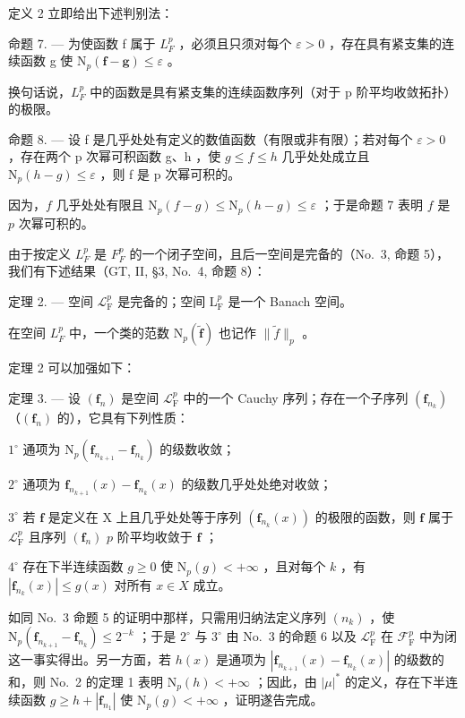 定义 2 立即给出下述判别法：

命题 7. --- 为使函数 f 属于 \(L_{F}^{p}\) ，必须且只须对每个 \(\varepsilon > 0\) ，存在具有紧支集的连续函数 g 使 \(\mathrm{N}_{p}(\mathbf{f} - \mathbf{g}) \leqslant \varepsilon\) 。

换句话说，\(L_{F}^{p}\) 中的函数是具有紧支集的连续函数序列（对于 p 阶平均收敛拓扑）的极限。

命题 8. --- 设 f 是几乎处处有定义的数值函数（有限或非有限）；若对每个 \(\varepsilon > 0\) ，存在两个 p 次幂可积函数 g、h ，使 \(g \leqslant f \leqslant h\) 几乎处处成立且 \(\mathrm{N}_{p}(h - g) \leqslant \varepsilon\) ，则 f 是 p 次幂可积的。

因为，\(f\) 几乎处处有限且 \(\mathrm{N}_p(f - g) \leqslant \mathrm{N}_p(h - g) \leqslant \varepsilon\) ；于是命题 7 表明 \(f\) 是 \(p\) 次幂可积的。

由于按定义 \(L_{F}^{p}\) 是 \(F_{F}^{p}\) 的一个闭子空间，且后一空间是完备的（No.~3, 命题 5），我们有下述结果（GT, II, §3, No.~4, 命题 8）：

定理 2. --- 空间 \(\mathcal{L}_{\mathrm{F}}^{p}\) 是完备的；空间 \(\mathrm{L}_{\mathrm{F}}^{p}\) 是一个 Banach 空间。

在空间 \(L_{F}^{p}\) 中，一个类的范数 \(\mathrm{N}_{p}(\widetilde{\mathbf{f}})\) 也记作 \(\| \widetilde{f} \|_{p}\) 。

定理 2 可以加强如下：

定理 3. --- 设 \((\mathbf{f}_n)\) 是空间 \(\mathcal{L}_{\mathrm{F}}^p\) 中的一个 Cauchy 序列；存在一个子序列 \((\mathbf{f}_{n_k})\) （\((\mathbf{f}_n)\) 的），它具有下列性质：

\(1^{\circ}\) 通项为 \(\mathrm{N}_p(\mathbf{f}_{n_{k + 1}} - \mathbf{f}_{n_k})\) 的级数收敛；

\(2^{\circ}\) 通项为 \(\mathbf{f}_{n_{k+1}}(x) - \mathbf{f}_{n_k}(x)\) 的级数几乎处处绝对收敛；

\(3^{\circ}\) 若 \(\mathbf{f}\) 是定义在 X 上且几乎处处等于序列 \((\mathbf{f}_{n_k}(x))\) 的极限的函数，则 \(\mathbf{f}\) 属于 \(\mathcal{L}_{\mathrm{F}}^p\) 且序列 \((\mathbf{f}_n)\) \(p\) 阶平均收敛于 \(\mathbf{f}\) ；

\(4^{\circ}\) 存在下半连续函数 \(g \geqslant 0\) 使 \(\mathrm{N}_p(g) < +\infty\) ，且对每个 \(k\) ，有 \(|\mathbf{f}_{n_k}(x)| \leqslant g(x)\) 对所有 \(x \in X\) 成立。

如同 No.~3 命题 5 的证明中那样，只需用归纳法定义序列 \((n_k)\) ，使 \(\mathrm{N}_p(\mathbf{f}_{n_{k+1}} - \mathbf{f}_{n_k}) \leqslant 2^{-k}\) ；于是 \(2^\circ\) 与 \(3^\circ\) 由 No.~3 的命题 6 以及 \(\mathcal{L}_{\mathrm{F}}^p\) 在 \(\mathcal{F}_{\mathrm{F}}^p\) 中为闭这一事实得出。另一方面，若 \(h(x)\) 是通项为 \(|\mathbf{f}_{n_{k+1}}(x) - \mathbf{f}_{n_k}(x)|\) 的级数的和，则 No.~2 的定理 1 表明 \(\mathrm{N}_p(h) < +\infty\) ；因此，由 \(|\mu|^*\) 的定义，存在下半连续函数 \(g \geqslant h + |\mathbf{f}_{n_1}|\) 使 \(\mathrm{N}_p(g) < +\infty\) ，证明遂告完成。

